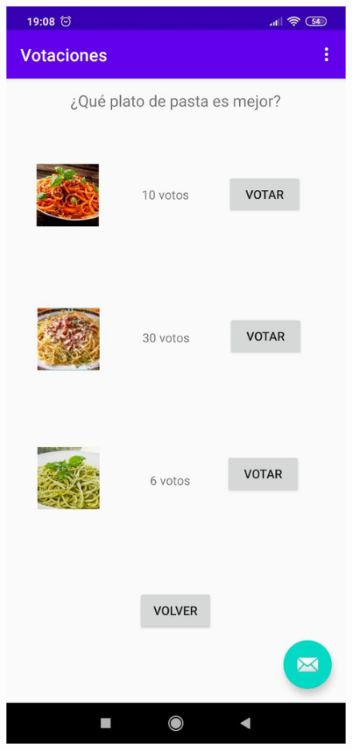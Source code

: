 \documentclass{article}
\begin{document}
 	\begin{figure}[H]
 		\centering
 		\includegraphics[totalheight=8cm]{img/android6}
 	\end{figure}
\end{document}
